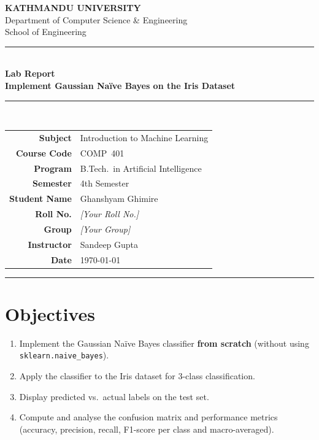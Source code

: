 \documentclass[12pt,a4paper]{article}
\begin{document}

\begin{center}
  {\Large\bfseries\color{kuBlue} KATHMANDU UNIVERSITY}\\[4pt]
  {\normalsize Department of Computer Science \& Engineering}\\[2pt]
  {\normalsize School of Engineering}\\[10pt]
  \rule{\linewidth}{1.5pt}\\[6pt]
  {\large\bfseries Lab Report}\\[4pt]
  {\LARGE\bfseries Implement Gaussian Na\"{i}ve Bayes on the Iris Dataset}\\[4pt]
  \rule{\linewidth}{0.8pt}\\[10pt]
\end{center}

\begin{center}
\renewcommand{\arraystretch}{1.4}
\begin{tabular}{r l}
  \textbf{Subject}      & Introduction to Machine Learning \\
  \textbf{Course Code}  & COMP~401 \\
  \textbf{Program}      & B.Tech.\ in Artificial Intelligence \\
  \textbf{Semester}     & 4th Semester \\
  \textbf{Student Name} & Ghanshyam Ghimire \\
  \textbf{Roll No.}     & \textit{[Your Roll No.]} \\
  \textbf{Group}        & \textit{[Your Group]} \\
  \textbf{Instructor}   & Sandeep Gupta \\
  \textbf{Date}         & \today \\
\end{tabular}
\end{center}

\vspace{10pt}
\hrule
\vspace{16pt}

\section{Objectives}

\begin{enumerate}[label=\arabic*.]
  \item Implement the Gaussian Na\"{i}ve Bayes classifier \textbf{from scratch} (without using \texttt{sklearn.naive\_bayes}).
  \item Apply the classifier to the Iris dataset for 3-class classification.
  \item Display predicted vs.\ actual labels on the test set.
  \item Compute and analyse the confusion matrix and performance metrics
        (accuracy, precision, recall, F1-score per class and macro-averaged).
\end{enumerate}
\end{document}
